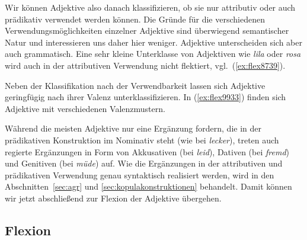 Wir können Adjektive also danach klassifizieren, ob sie nur attributiv oder auch prädikativ verwendet werden können.
Die Gründe für die verschiedenen Verwendungsmöglichkeiten einzelner Adjektive sind überwiegend semantischer Natur und interessieren uns daher hier weniger.
Adjektive unterscheiden sich aber auch grammatisch.
Eine sehr kleine Unterklasse von Adjektiven wie \textit{lila} oder \textit{rosa} wird auch in der attributiven Verwendung nicht flektiert, vgl.\ (\ref{ex:flex8739}).

\begin{exe}
  \ex \label{ex:flex8739}
  \begin{xlist}
  \end{xlist}
\end{exe}

Neben der Klassifikation nach der Verwendbarkeit lassen sich Adjektive geringfügig nach ihrer Valenz unterklassifizieren.
In (\ref{ex:flex9933}) finden sich Adjektive mit verschiedenen Valenzmustern.


\begin{exe}
  \ex \label{ex:flex9933}
  \begin{xlist}
  \end{xlist}
\end{exe}

Während die meisten Adjektive nur eine Ergänzung fordern, die in der prädikativen Konstruktion im Nominativ steht (wie bei \textit{lecker}), treten auch regierte Ergänzungen in Form von Akkusativen (bei \textit{leid}), Dativen (bei \textit{fremd}) und Genitiven (bei \textit{müde}) auf.
Wie die Ergänzungen in der attributiven und prädikativen Verwendung genau syntaktisch realisiert werden, wird in den Abschnitten~\ref{sec:agr} und \ref{sec:kopulakonstruktionen} behandelt.
Damit können wir jetzt abschließend zur Flexion der Adjektive übergehen.

\subsection{Flexion}

\label{sec:adjektivflexion}

